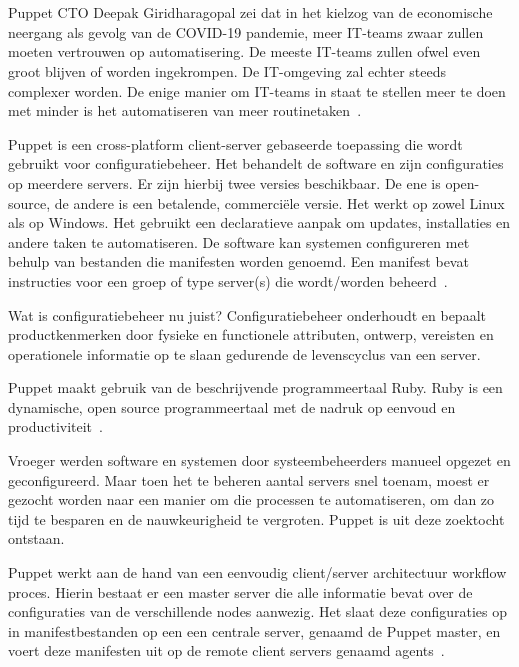 \section{}
\label{sec:Puppet}

Puppet CTO Deepak Giridharagopal zei dat in het kielzog van de economische neergang als gevolg van de COVID-19 pandemie, meer IT-teams zwaar zullen moeten vertrouwen op automatisering. De meeste IT-teams zullen ofwel even groot blijven of worden ingekrompen. De IT-omgeving zal echter steeds complexer worden. De enige manier om IT-teams in staat te stellen meer te doen met minder is het automatiseren van meer routinetaken~\autocite{Vizard2020}. %

Puppet is een cross-platform client-server gebaseerde toepassing die wordt gebruikt voor configuratiebeheer. Het behandelt de software en zijn configuraties op meerdere servers. Er zijn hierbij twee versies beschikbaar. De ene is open-source, de andere is een betalende, commerciële versie. Het werkt op zowel Linux als op Windows. Het gebruikt een declaratieve aanpak om updates, installaties en andere taken te automatiseren. De software kan systemen configureren met behulp van bestanden die manifesten worden genoemd. Een manifest bevat instructies voor een groep of type server(s) die wordt/worden beheerd~\autocite{Kelly2020}. %

Wat is configuratiebeheer nu juist? Configuratiebeheer onderhoudt en bepaalt productkenmerken door fysieke en functionele attributen, ontwerp, vereisten en operationele informatie op te slaan gedurende de levenscyclus van een server. 

Puppet maakt gebruik van de beschrijvende programmeertaal Ruby. Ruby is een dynamische, open source programmeertaal met de nadruk op eenvoud en productiviteit~\autocite{Ruby}. %

Vroeger werden software en systemen door systeembeheerders manueel opgezet en geconfigureerd. Maar toen het te beheren aantal servers snel toenam, moest er gezocht worden naar een manier om die processen te automatiseren, om dan zo tijd te besparen en de nauwkeurigheid te vergroten. Puppet is uit deze zoektocht ontstaan.

Puppet werkt aan de hand van een eenvoudig client/server architectuur workflow proces. Hierin bestaat er een master server die alle informatie bevat over de configuraties van de verschillende nodes aanwezig. Het slaat deze configuraties op in manifestbestanden op een een centrale server, genaamd de Puppet master, en voert deze manifesten uit op de remote client servers genaamd agents~\autocite{Kelly2020}. %

